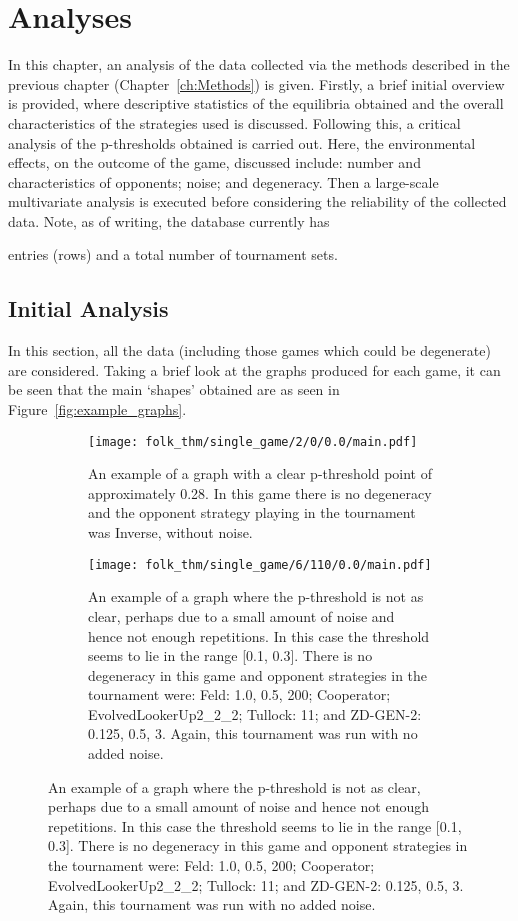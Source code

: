 \chapter{Analyses}
In this chapter, an analysis of the data collected via the methods described in
the previous chapter (Chapter~\ref{ch:Methods}) is given. Firstly, a brief
initial overview is provided, where descriptive statistics of the equilibria
obtained and the overall characteristics of the strategies used is discussed.
Following this, a critical analysis of the p-thresholds obtained is carried out.
Here, the environmental effects, on the outcome of the game, discussed include:
number and characteristics of opponents; noise; and degeneracy. Then a
large-scale multivariate analysis is executed before considering the reliability
of the collected data. Note, as of writing, the database currently has 

entries (rows) and a total number of  tournament sets.

\section{Initial Analysis}
In this section, all the data (including those games which could be degenerate)
are considered. Taking a brief look at the graphs produced for each game, it can
be seen that the main `shapes' obtained are as seen in
Figure~\ref{fig:example_graphs}.

\begin{figure}
    \centering
    \begin{subfigure}[0.3\textwidth]
        \centering
        \texttt{[image: folk\_thm/single\_game/2/0/0.0/main.pdf]}
        \caption{An example of a graph with a clear p-threshold point of approximately 0.28. In this game there is no degeneracy and the opponent strategy playing in the tournament was Inverse, without noise.}
    \end{subfigure}
    \begin{subfigure}[0.3\textwidth]
        \centering
        \texttt{[image: folk\_thm/single\_game/6/110/0.0/main.pdf]}
        \caption{An example of a graph where the p-threshold is not as clear, perhaps due to a small amount of noise and hence not enough repetitions. In this case the threshold seems to lie in the range [0.1, 0.3]. There is no degeneracy in this game and opponent strategies in the tournament were: Feld: 1.0, 0.5, 200; Cooperator;  EvolvedLookerUp2_2_2; Tullock: 11; and ZD-GEN-2: 0.125, 0.5, 3. Again, this tournament was run with no added noise.}
    \end{subfigure}
\end{figure}

